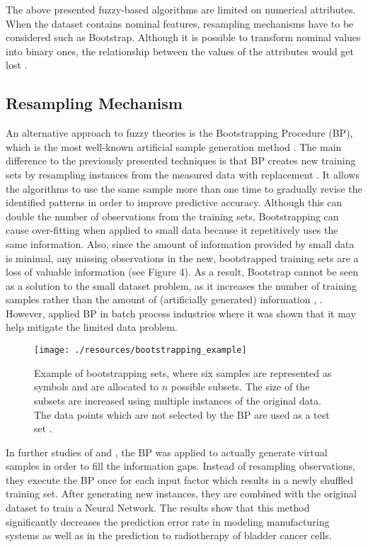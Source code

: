 \documentclass[parskip=full]{scrartcl}
\begin{document}
The above presented fuzzy-based algorithms are limited on numerical attributes. When the dataset 
contains nominal features, resampling mechanisms have to be considered such as Bootstrap. Although 
it is possible to transform nominal values into binary ones, the relationship between the values of the 
attributes would get lost \cite{Tsai.2008}. 

\subsection{Resampling Mechanism}

An alternative approach to fuzzy theories is the Bootstrapping Procedure (BP), which is the most 
well-known artificial sample generation method \cite{AbdulLateh.2017}. The main difference to the 
previously presented techniques is that BP creates new training sets by resampling instances from the
measured data with replacement \cite{Efron.1993}. It allows the algorithms to use the same sample more 
than one time to gradually revise the identified patterns in order to improve predictive accuracy. 
Although this can double the number of observations from the training sets, Bootstrapping can cause 
over-fitting when applied to small data because it repetitively uses the same information. Also, since the 
amount of information provided by small data is minimal, any missing observations in the new, 
bootstrapped training sets are a loss of valuable information (see Figure 4). As a result, Bootstrap 
cannot be seen as a solution to the small dataset problem, as it increases the number of training 
samples rather than the amount of (artificially generated) information \cite{Tsai.2015}, \cite{Li.2018}. 
However, \cite{Ivanescu.2006} applied BP in batch process industries where it was shown that it may 
help mitigate the limited data problem.

\begin{figure}[H]
	\centering
	\texttt{[image: ./resources/bootstrapping\_example]}
	\caption{Example of bootstrapping sets, where six samples are represented 
	as symbols and are allocated to $\mathit{n}$ possible subsets. The size of 
	the subsets are increased using multiple instances of the original data. 
	The data points which are not selected by the BP are used as a test set 
	\cite{Kuhn.2013}.}
	\label{fig:bootstrappingexample}
\end{figure}

In further studies of \cite{Tsai.2008} and \cite{Chao.2011}, the BP was applied to actually generate 
virtual samples in order to fill the information gaps. Instead of resampling observations, they execute 
the BP once for each input factor which results in a newly shuffled training set. After generating new
instances, they are combined with the original dataset to train a Neural Network. The results show that 
this method significantly decreases the prediction error rate in modeling manufacturing systems as well 
as in the prediction to radiotherapy of bladder cancer cells.
\end{document}
